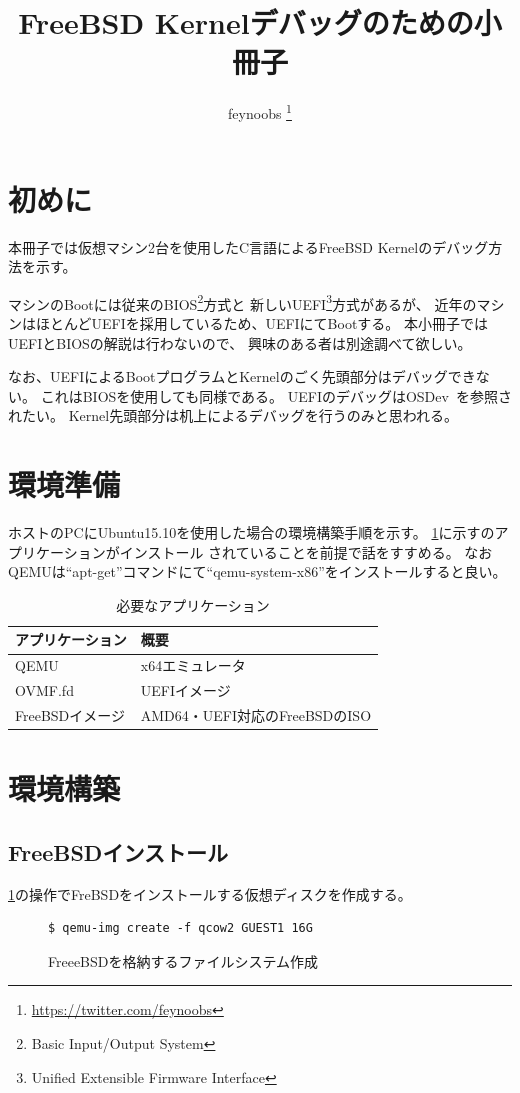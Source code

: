 \documentclass[a4j]{jarticle}
\title{FreeBSD Kernelデバッグのための小冊子}
\author{feynoobs \thanks{\protect\url{https://twitter.com/feynoobs}}}
\begin{document}
\maketitle

\tableofcontents

\newpage

\section{初めに}
本冊子では仮想マシン2台を使用したC言語によるFreeBSD Kernelのデバッグ方法を示す。

マシンのBootには従来のBIOS\footnote{Basic Input/Output System}方式と
新しいUEFI\footnote{Unified Extensible Firmware Interface}方式があるが、
近年のマシンはほとんどUEFIを採用しているため、UEFIにてBootする。
本小冊子ではUEFIとBIOSの解説は行わないので、
興味のある者は別途調べて欲しい。

なお、UEFIによるBootプログラムとKernelのごく先頭部分はデバッグできない。
これはBIOSを使用しても同様である。
UEFIのデバッグはOSDev~\cite{OSDev}を参照されたい。
Kernel先頭部分は机上によるデバッグを行うのみと思われる。

\section{環境準備}
ホストのPCにUbuntu15.10を使用した場合の環境構築手順を示す。
\ref{tb:FreeBSD:_ENV}に示すのアプリケーションがインストール
されていることを前提で話をすすめる。
なおQEMUは``apt-get''コマンドにて``qemu-system-x86''をインストールすると良い。
\begin{table}[htp]
	\caption{必要なアプリケーション}
	\label{tb:FreeBSD:_ENV}
	\centering
	\begin{tabular}{|l|p{10cm}|}									\hline
		アプリケーション	&	概要							\\	\hline	\hline
		QEMU				&	x64エミュレータ				\\	\hline
		OVMF.fd				&	UEFIイメージ					\\	\hline
		FreeBSDイメージ		&	AMD64・UEFI対応のFreeBSDのISO	\\	\hline
	\end{tabular}
\end{table}

\section{環境構築}
\subsection{FreeBSDインストール}
\label{sec:FreeBSD_inst}
\ref{fig:FreeBSD_CREATE}の操作でFreBSDをインストールする仮想ディスクを作成する。
\begin{figure}[htbp]
	\centering
	\begin{lstlisting}[basicstyle=\ttfamily\footnotesize, frame=single, breaklines=true]
$ qemu-img create -f qcow2 GUEST1 16G
	\end{lstlisting}
	\caption{FreeeBSDを格納するファイルシステム作成}
	\label{fig:FreeBSD_CREATE}
\end{figure}
\end{document}
